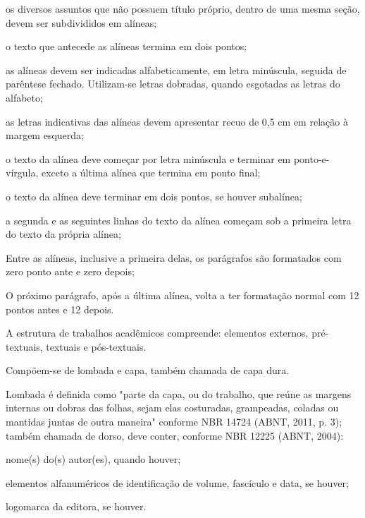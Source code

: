 \documentclass[a4paper,12pt]{article}  %
\begin{document}
\begin{ElementosTextuais}
\begin{Desenvolvimento}
\begin{alinea}
  \item os diversos assuntos que não possuem título próprio, dentro de uma mesma seção, devem ser subdivididos em alíneas;
  \item o texto que antecede as alíneas termina em dois pontos;
  \item as alíneas devem ser indicadas alfabeticamente, em letra minúscula, seguida de parêntese fechado. Utilizam-se letras dobradas, quando esgotadas as letras do alfabeto;
  \item as letras indicativas das alíneas devem apresentar recuo de 0,5 cm em relação à margem esquerda;
  \item o texto da alínea deve começar por letra minúscula e terminar em ponto-e-vírgula, exceto a última alínea que termina em ponto final;
  \item o texto da alínea deve terminar em dois pontos, se houver subalínea;
  \item a segunda e as seguintes linhas do texto da alínea começam sob a primeira letra do texto da própria alínea;
  \item Entre as alíneas, inclusive a primeira delas, os parágrafos são formatados com zero ponto ante e zero depois;
  \item O próximo parágrafo, após a última alínea, volta a ter formatação normal com 12 pontos antes e 12 depois.
\end{alinea}

A estrutura de trabalhos acadêmicos compreende: elementos externos, pré-textuais, textuais e pós-textuais.

Compõem-se de lombada e capa, também chamada de capa dura.

Lombada é definida como "parte da capa, ou do trabalho, que reúne as margens internas ou dobras das folhas, sejam elas costuradas, grampeadas, coladas ou mantidas juntas de outra maneira" conforme NBR 14724 (ABNT, 2011, p. 3); também chamada de dorso, deve conter, conforme NBR 12225 (ABNT, 2004):

\begin{alinea}
  \item nome(s) do(s) autor(es), quando houver;
  \item elementos alfanuméricos de identificação de volume, fascículo e data, se houver;
  \item logomarca da editora, se houver.
\end{alinea}


\end{Desenvolvimento}
\end{ElementosTextuais}
\end{document}

